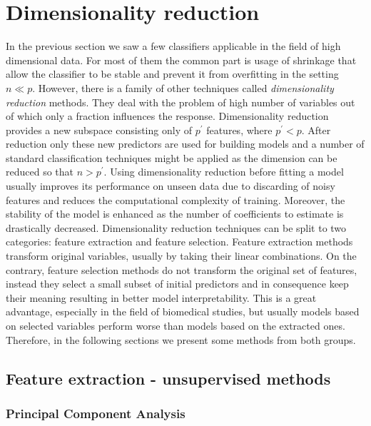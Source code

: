 \documentclass[shortabstract, english, mgr]{iithesis}
\begin{document}
\section{Dimensionality reduction}

In the previous section we saw a few classifiers applicable in the field of high dimensional data. For most of them the common part is usage of shrinkage that allow the classifier to be stable and prevent it from overfitting in the setting $n \ll p$. However, there is a family of other techniques called \textit{dimensionality reduction} methods. They deal with the problem of high number of variables out of which only a fraction influences the response. Dimensionality reduction provides a new subspace consisting only of $p^{\prime}$ features, where $p^{\prime} < p$. After reduction only these new predictors are used for building models and a number of standard classification techniques might be applied as the dimension can be reduced so that $n > p^{\prime}$. Using dimensionality reduction before fitting a model usually improves its performance on unseen data due to discarding of noisy features and reduces the computational complexity of training. Moreover, the stability of the model is enhanced as the number of coefficients to estimate is drastically decreased. Dimensionality reduction techniques can be split to two categories: feature extraction and feature selection. Feature extraction methods transform original variables, usually by taking their linear combinations. On the contrary, feature selection methods do not transform the original set of features, instead they select a small subset of initial predictors and in consequence keep their meaning resulting in better model interpretability. This is a great advantage, especially in the field of biomedical studies, but usually models based on selected variables perform worse than models based on the extracted ones. Therefore, in the following sections we present some methods from both groups.

\subsection{Feature extraction - unsupervised methods}

\subsubsection{Principal Component Analysis}
\end{document}
